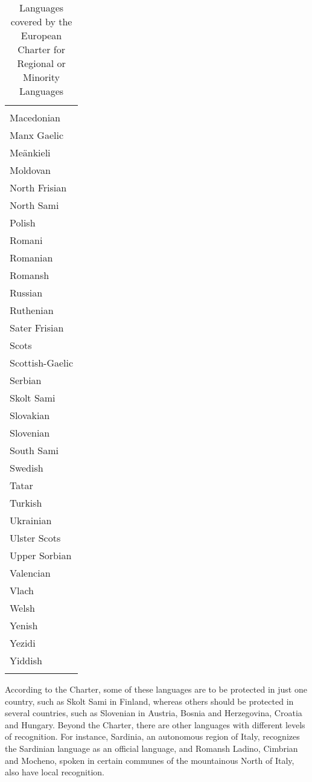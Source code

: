 \documentclass[output=paper]{langscibook}
\begin{document}
\begin{table}
\begin{tabularx}{\textwidth}{l}
{\begin{multicols}{4}
Lule Sami\\
Macedonian\\
Manx Gaelic\\
Meänkieli\\
Moldovan\\
North Frisian\\
North Sami\\
Polish\\
Romani\\
Romanian\\
Romansh\\
Russian\\
Ruthenian\\
Sater Frisian\\
Scots\\
Scottish-Gaelic\\
Serbian\\
Skolt Sami\\
Slovakian\\
Slovenian\\
South Sami\\
Swedish\\
Tatar\\
Turkish\\
Ukrainian\\
Ulster Scots\\
Upper Sorbian\\
Valencian\\
Vlach\\
Welsh\\
Yenish\\
Yezidi\\
Yiddish
\end{multicols}
}\\
\lspbottomrule
\end{tabularx}
\caption{Languages covered by the European Charter for Regional or Minority Languages}
\label{tab:torres:1}
\end{table}

According to the Charter, some of these languages are to be protected in just one country, such as Skolt Sami in Finland, whereas others should be protected in several countries, such as Slovenian in Austria, Bosnia and Herzegovina, Croatia and Hungary. Beyond the Charter, there are other languages with different levels of recognition. For instance, Sardinia, an autonomous region of Italy, recognizes the Sardinian language as an official language, and Romansh Ladino, Cimbrian and Mocheno, spoken in certain communes of the mountainous North of Italy, also have local recognition. 
\end{document}
